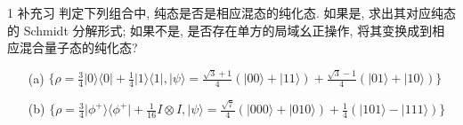 \documentclass{assignment}
\begin{document}
\begin{probcontinued}{1 补充习}
    判定下列组合中, 纯态是否是相应混态的纯化态. 如果是, 求出其对应纯态的 Schmidt 分解形式; 如果不是, 是否存在单方的局域幺正操作, 将其变换成到相应混合量子态的纯化态?
    \begin{itemize}
        \item[(a)] $\{\rho=\frac{3}{4}\lvert 0\rangle\langle 0\rvert+\frac{1}{4}\lvert 1\rangle\langle 1\rvert,\lvert\psi\rangle=\frac{\sqrt{3}+1}{4}(\lvert 00\rangle+\lvert 11\rangle)+\frac{\sqrt{3}-1}{4}(\lvert 01\rangle+\lvert 10\rangle)\}$
        \item[(b)] $\{\rho=\frac{3}{4}\lvert\phi^+\rangle\langle\phi^+\rvert+\frac{1}{16}I\otimes I,\lvert\psi\rangle=\frac{\sqrt{7}}{4}(\lvert 000\rangle+\lvert 010\rangle)+\frac{1}{4}(\lvert 101\rangle-\lvert 111\rangle)\}$
    \end{itemize}
\end{probcontinued}
\end{document}
